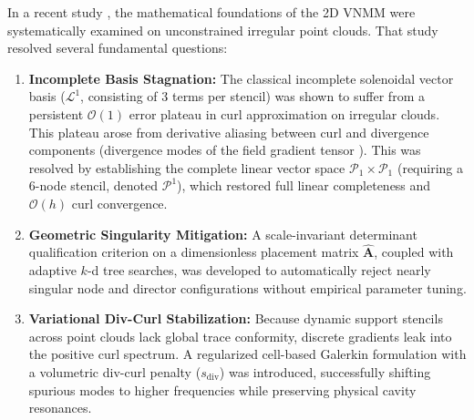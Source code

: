 \documentclass[VANCOUVER]{USG}
\begin{document}
In a recent study \cite{stable_vnmm2d_2026}, the mathematical foundations of the 2D VNMM were systematically examined on unconstrained irregular point clouds. That study resolved several fundamental questions:
\begin{enumerate}
    \item \textbf{Incomplete Basis Stagnation:} The classical incomplete solenoidal vector basis ($\mathcal{L}^1$, consisting of 3 terms per stencil) was shown to suffer from a persistent $\mathcal{O}(1)$ error plateau in curl approximation on irregular clouds. This plateau arose from derivative aliasing between curl and divergence components (divergence modes of the field gradient tensor \cite{stable_vnmm2d_2026}). This was resolved by establishing the complete linear vector space $\mathcal{P}_1 \times \mathcal{P}_1$ (requiring a 6-node stencil, denoted $\mathcal{P}^1$), which restored full linear completeness and $\mathcal{O}(h)$ curl convergence.
    \item \textbf{Geometric Singularity Mitigation:} A scale-invariant determinant qualification criterion on a dimensionless placement matrix $\widehat{\mathbf{A}}$, coupled with adaptive $k$-d tree searches, was developed to automatically reject nearly singular node and director configurations without empirical parameter tuning.
    \item \textbf{Variational Div-Curl Stabilization:} Because dynamic support stencils across point clouds lack global trace conformity, discrete gradients leak into the positive curl spectrum. A regularized cell-based Galerkin formulation with a volumetric div-curl penalty ($s_{\mathrm{div}}$) was introduced, successfully shifting spurious modes to higher frequencies while preserving physical cavity resonances.
\end{enumerate}
\end{document}
